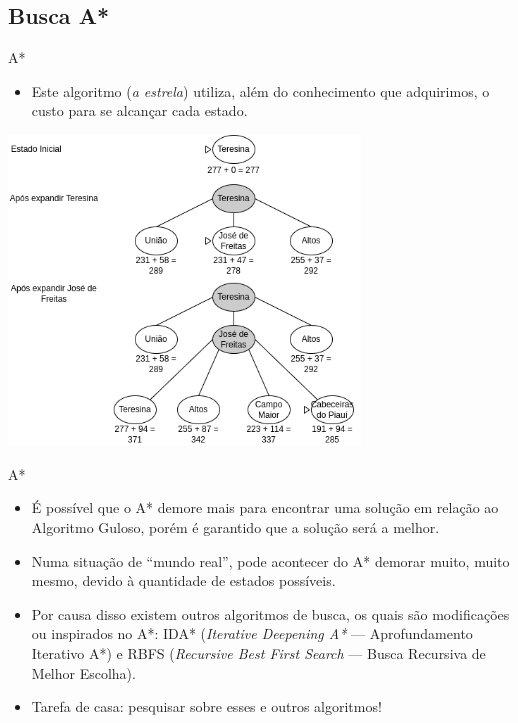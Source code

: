\documentclass{libs/ufc_format}
\begin{document}
\subsection{Busca A*}

\begin{frame}{A*}
    \begin{itemize}
        \justifying
        \item Este algoritmo (\textit{a estrela}) utiliza, além do conhecimento que adquirimos, o custo para se alcançar cada estado.
    \end{itemize}
    \centering
    \includegraphics[width=0.7\textwidth]{figuras/a_estrela}
\end{frame}

\begin{frame}{A*}
    \begin{itemize}
        \justifying
        \item É possível que o A* demore mais para encontrar uma solução em relação ao Algoritmo Guloso, porém é garantido que a solução será a melhor.
        \item<2-> Numa situação de ``mundo real'', pode acontecer do A* demorar muito, muito mesmo, devido à quantidade de estados possíveis.
        \item<3-> Por causa disso existem outros algoritmos de busca, os quais são modificações ou inspirados no A*: IDA* (\textit{Iterative Deepening A*} --- Aprofundamento Iterativo A*) e RBFS (\textit{Recursive Best First Search} --- Busca Recursiva de Melhor Escolha).
        \item<4-> \alert{Tarefa de casa: pesquisar sobre esses e outros algoritmos!}
    \end{itemize}
\end{frame}
\end{document}
